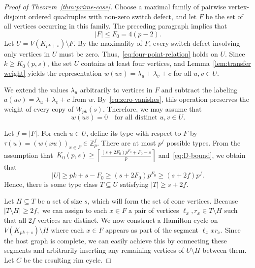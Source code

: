 \documentclass[11pt]{article}
\theoremstyle{remark}
\newcommand{\Z}{\mathbb Z}
\begin{document}
\begin{proof}[Proof of Theorem~\ref{thm:prime-case}]
    Choose a maximal family of pairwise vertex-disjoint ordered quadruples with non-zero switch defect, and let $F$ be the set of all vertices occurring in this family.
    The preceding paragraph implies that
    \begin{equation}\label{eq:D-bound}
        |F|\le F_0=4(p-2).
    \end{equation}
    Let $U=V(K_{pk+s})\setminus F$.
    By the maximality of $F$, every switch defect involving only vertices in $U$ must be zero.
    Thus,~\eqref{eq:four-point-relation} holds on $U$.
    Since $k\ge K_0(p,s)$, the set $U$ contains at least four vertices, and Lemma~\ref{lem:transfer weight} yields the representation $w(uv)=\lambda_u+\lambda_v+c$ for all $u,v\in U$.

    We extend the values $\lambda_u$ arbitrarily to vertices in $F$ and subtract the labeling $a(uv)=\lambda_u+\lambda_v+c$ from $w$. By~\eqref{eq:zero-vanishes}, this operation preserves the weight of every copy of $W_{pk}(s)$.
    Therefore, we may assume that
    \begin{equation}\label{eq:U-zero}
        w(uv)=0\quad\text{for all distinct }u,v\in U.
    \end{equation}

    Let $f=|F|$.
    For each $u\in U$, define its type with respect to $F$ by $\tau(u)=(w(xu))_{x\in F}\in\Z_p^f$.
    There are at most $p^f$ possible types. From the assumption that~$K_0(p,s)\ge \left\lceil\frac{(s+2F_0)p^{F_0}+F_0-s}{p}\right\rceil$ and~\eqref{eq:D-bound}, we obtain that
    \[
        |U|\ge pk+s-F_0\ge (s+2F_0)p^{F_0}\ge (s+2f)p^f.
    \]
    Hence, there is some type class $T\subseteq U$ satisfying $|T|\ge s+2f$.

    Let $H\subseteq T$ be a set of size $s$, which will form the set of cone vertices.
    Because $|T\setminus H|\ge2f,$ we can assign to each $x\in F$ a pair of vertices $\ell_x,r_x\in T\setminus H$ such that all $2f$ vertices are distinct.
    We now construct a Hamilton cycle on $V(K_{pk+s})\setminus H$ where each $x\in F$ appears as part of the segment $\ell_xxr_x$.
    Since the host graph is complete, we can easily achieve this by connecting these segments and arbitrarily inserting any remaining vertices of $U\setminus H$ between them.
    Let $C$ be the resulting rim cycle.


\end{proof}
\end{document}
